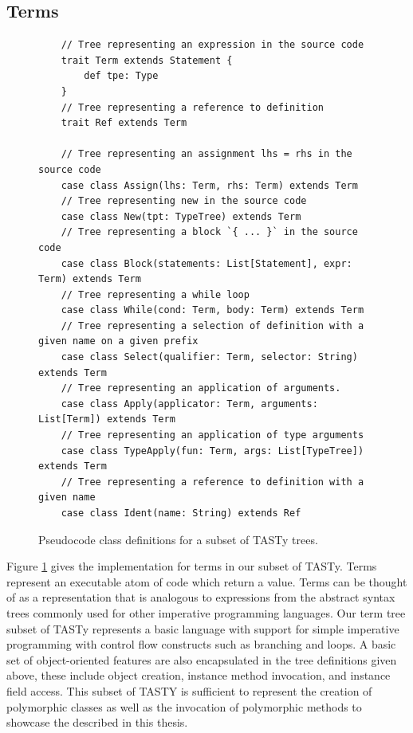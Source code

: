 \subsection{Terms}
\label{section:tasty:terms}

\begin{figure}[!htb]
	\begin{verbatim}
	// Tree representing an expression in the source code
	trait Term extends Statement {
		def tpe: Type
	}
	// Tree representing a reference to definition      
	trait Ref extends Term             
	
	// Tree representing an assignment lhs = rhs in the source code
	case class Assign(lhs: Term, rhs: Term) extends Term
	// Tree representing new in the source code
	case class New(tpt: TypeTree) extends Term
	// Tree representing a block `{ ... }` in the source code
	case class Block(statements: List[Statement], expr: Term) extends Term
	// Tree representing a while loop
	case class While(cond: Term, body: Term) extends Term
	// Tree representing a selection of definition with a given name on a given prefix
	case class Select(qualifier: Term, selector: String) extends Term 
	// Tree representing an application of arguments.
	case class Apply(applicator: Term, arguments: List[Term]) extends Term
	// Tree representing an application of type arguments
	case class TypeApply(fun: Term, args: List[TypeTree]) extends Term
	// Tree representing a reference to definition with a given name
	case class Ident(name: String) extends Ref 
	\end{verbatim} 
	\caption{Pseudocode class definitions for a subset of TASTy trees.}
	\label{tasty:terms}
\end{figure}

Figure \ref{tasty:terms} gives the implementation for terms in our subset of TASTy.
Terms represent an executable atom of code which return a value.
Terms can be thought of as a representation that is analogous to expressions from the abstract syntax trees commonly used for other imperative programming languages.
Our term tree subset of TASTy represents a basic language with support for simple imperative programming with control flow constructs such as branching and loops.
A basic set of object-oriented features are also encapsulated in the tree definitions given above, these include object creation, instance method invocation, and instance field access.
This subset of TASTY is sufficient to represent the creation of polymorphic classes as well as the invocation of polymorphic methods to showcase the described in this thesis.

